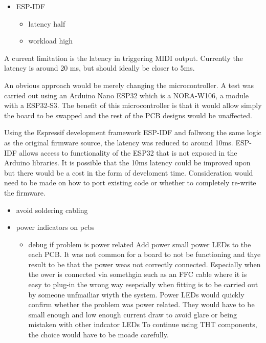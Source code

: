 \begin{itemize}
\item
  ESP-IDF

  \begin{itemize}
  \item
    latency half
  \item
    workload high
  \end{itemize}
\end{itemize}

A current limitation is the latency in triggering MIDI output. Currently
the latency is around 20 ms, but should ideally be closer to 5ms.

An obvious approach would be merely changing the microcontroller. A test
was carried out using an Arduino Nano ESP32 which is a NORA-W106, a
module with a ESP32-S3. The benefit of this microcontroller is that it
would allow simply the board to be swapped and the rest of the PCB
designs would be unaffected.

Using the Espressif development framework ESP-IDF and follwong the same
logic as the original firmware source, the latency was reduced to around
10ms. ESP-IDF allows access to functionality of the ESP32 that is not
exposed in the Arduino libraries. It is possible that the 10ms latency
could be improved upon but there would be a cost in the form of
develoment time. Consideration would need to be made on how to port
existing code or whether to completely re-write the firmware.

\begin{itemize}
\item
  avoid soldering cabling
\item
  power indicators on pcbs

  \begin{itemize}
  \item
    debug if problem is power related Add power small power LEDs to the
    each PCB. It was not common for a board to not be functioning and
    thye result to be that the power weas not correctly connected.
    Especially when the ower is connected via somethgin such as an FFC
    cable where it is easy to plug-in the wrong way esepcially when
    fitting is to be carried out by someone unfmailiar wiyth the system.
    Power LEDs would quickly confirm whether the problem was power
    related. They would have to be small enough and low enough current
    draw to avoid glare or being mistaken with other indcator LEDs To
    continue using THT components, the choice would have to be moade
    carefully.
  \end{itemize}
\end{itemize}

